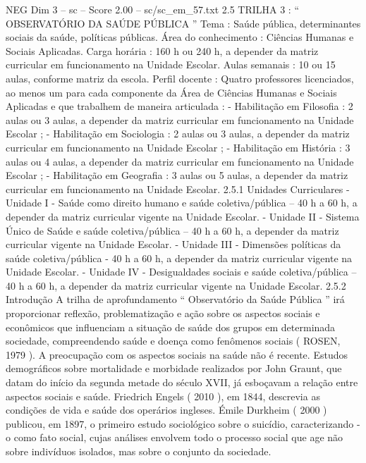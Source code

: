 \begin{textsample}{NEG Dim 3 – sc – Score 2.00 – sc/sc\_em\_57.txt}  \label{ex:f3_neg_226}
2.5 TRILHA 3 : “ OBSERVATÓRIO DA SAÚDE PÚBLICA ” Tema : Saúde pública, determinantes sociais da saúde, políticas públicas.
Área do conhecimento : Ciências Humanas e Sociais Aplicadas.
Carga horária : 160 h ou 240 h, a depender da matriz curricular em funcionamento na Unidade Escolar.
Aulas semanais : 10 ou 15 aulas, conforme matriz da escola.
Perfil docente : Quatro professores licenciados, ao menos um para cada componente da Área de Ciências Humanas e Sociais Aplicadas e que trabalhem de maneira articulada : - Habilitação em Filosofia : 2 aulas ou 3 aulas, a depender da matriz curricular em funcionamento na Unidade Escolar ; - Habilitação em Sociologia : 2 aulas ou 3 aulas, a depender da matriz curricular em funcionamento na Unidade Escolar ; - Habilitação em História : 3 aulas ou 4 aulas, a depender da matriz curricular em funcionamento na Unidade Escolar ; - Habilitação em Geografia : 3 aulas ou 5 aulas, a depender da matriz curricular em funcionamento na Unidade Escolar. 2.5.1 Unidades Curriculares - Unidade I - Saúde como direito humano e saúde coletiva/pública – 40 h a 60 h, a depender da matriz curricular vigente na Unidade Escolar. - Unidade II - Sistema Único de Saúde e saúde coletiva/pública – 40 h a 60 h, a depender da matriz curricular vigente na Unidade Escolar. - Unidade III - Dimensões políticas da saúde coletiva/pública - 40 h a 60 h, a depender da matriz curricular vigente na Unidade Escolar. - Unidade IV - Desigualdades sociais e saúde coletiva/pública – 40 h a 60 h, a depender da matriz curricular vigente na Unidade Escolar. 2.5.2 Introdução A trilha de aprofundamento “ Observatório da Saúde Pública ” irá proporcionar reflexão, problematização e ação sobre os aspectos sociais e econômicos que influenciam a situação de saúde dos grupos em determinada sociedade, compreendendo saúde e doença como fenômenos sociais ( ROSEN, 1979 ).
A preocupação com os aspectos sociais na saúde não é recente.
Estudos demográficos sobre mortalidade e morbidade realizados por John Graunt, que datam do início da segunda metade do século XVII, já esboçavam a relação entre aspectos sociais e saúde.
Friedrich Engels ( 2010 ), em 1844, descrevia as condições de vida e saúde dos operários ingleses.
Émile Durkheim ( 2000 ) publicou, em 1897, o primeiro estudo sociológico sobre o suicídio, caracterizando -o como fato social, cujas análises envolvem todo o processo social que age não sobre indivíduos isolados, mas sobre o conjunto da sociedade.

\end{textsample}
